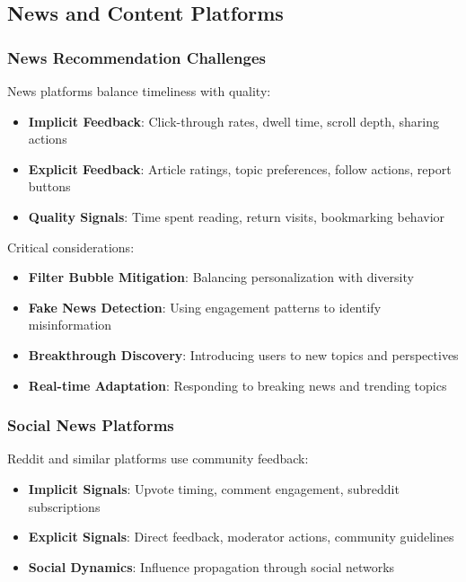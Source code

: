 \subsection{News and Content Platforms}

\subsubsection{News Recommendation Challenges}

News platforms balance timeliness with quality:

\begin{itemize}
    \item \textbf{Implicit Feedback}: Click-through rates, dwell time, scroll depth, sharing actions
    \item \textbf{Explicit Feedback}: Article ratings, topic preferences, follow actions, report buttons
    \item \textbf{Quality Signals}: Time spent reading, return visits, bookmarking behavior
\end{itemize}

Critical considerations:
\begin{itemize}
    \item \textbf{Filter Bubble Mitigation}: Balancing personalization with diversity
    \item \textbf{Fake News Detection}: Using engagement patterns to identify misinformation
    \item \textbf{Breakthrough Discovery}: Introducing users to new topics and perspectives
    \item \textbf{Real-time Adaptation}: Responding to breaking news and trending topics
\end{itemize}

\subsubsection{Social News Platforms}

Reddit and similar platforms use community feedback:

\begin{itemize}
    \item \textbf{Implicit Signals}: Upvote timing, comment engagement, subreddit subscriptions
    \item \textbf{Explicit Signals}: Direct feedback, moderator actions, community guidelines
    \item \textbf{Social Dynamics}: Influence propagation through social networks
\end{itemize}

